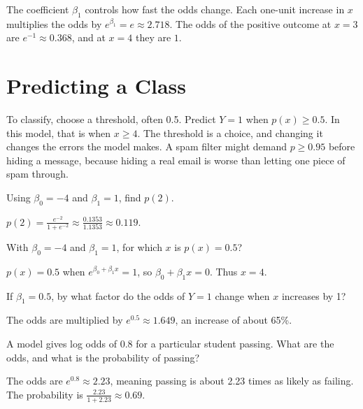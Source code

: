 The coefficient $\beta_1$ controls how fast the odds change. Each one-unit increase in $x$
multiplies the odds by $e^{\beta_1} = e \approx 2.718$. The odds of the positive
outcome at $x = 3$ are $e^{-1} \approx 0.368$, and at $x = 4$ they are $1$.

\section{Predicting a Class}
To classify, choose a threshold, often 0.5. Predict $Y = 1$ when $p(x) \ge 0.5$. In this model,
that is when $x \ge 4$. The threshold is a choice, and changing it changes the errors the model makes.
A spam filter might demand $p \ge 0.95$ before hiding a message, because
hiding a real email is worse than letting one piece of spam through.

\begin{Exercise}[label=slog1, title=Compute a probability]
Using $\beta_0 = -4$ and $\beta_1 = 1$, find $p(2)$.
\end{Exercise}
\begin{Answer}[ref=slog1]
$p(2) = \frac{e^{-2}}{1 + e^{-2}} \approx \frac{0.1353}{1.1353} \approx 0.119$.
\end{Answer}

\begin{Exercise}[label=slog2, title=Find the threshold value]
With $\beta_0 = -4$ and $\beta_1 = 1$, for which $x$ is $p(x) = 0.5$?
\end{Exercise}
\begin{Answer}[ref=slog2]
$p(x) = 0.5$ when $e^{\beta_0 + \beta_1 x} = 1$, so $\beta_0 + \beta_1 x = 0$. Thus $x = 4$.
\end{Answer}

\begin{Exercise}[label=slog3, title=Interpret the odds ratio]
If $\beta_1 = 0.5$, by what factor do the odds of $Y = 1$ change when $x$ increases by 1?
\end{Exercise}
\begin{Answer}[ref=slog3]
The odds are multiplied by $e^{0.5} \approx 1.649$, an increase of about 65\%.
\end{Answer}

\begin{Exercise}[label=slog4, title=From odds to probability]
A model gives log odds of $0.8$ for a particular student passing. What are the
odds, and what is the probability of passing?
\end{Exercise}
\begin{Answer}[ref=slog4]
The odds are $e^{0.8} \approx 2.23$, meaning passing is about 2.23 times as likely as
failing. The probability is $\frac{2.23}{1 + 2.23} \approx 0.69$.
\end{Answer}

